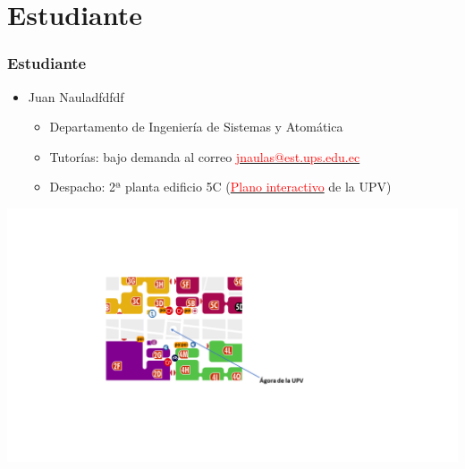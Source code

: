 \section{Estudiante}

\begin{frame}[fragile, label = profesorado]
\frametitle{Estudiante}
\begin{itemize}
    \item Juan Nauladfdfdf
    \begin{itemize}
        \item Departamento de Ingeniería de Sistemas y Atomática
        \item{Tutorías: bajo demanda al correo \href{mailto:jnaulas@est.ups.edu.ec}{\textcolor{red}{jnaulas@est.ups.edu.ec}}}
        \item Despacho: 2ª planta edificio 5C (\href{http://www.upv.es/plano/plano-2d-es.html?entidad=ACOM}{\textcolor{red}{Plano interactivo}} de la UPV)
    \end{itemize}
\end{itemize}


\includegraphics[trim=5cm 0cm 5cm 5cm, clip, width=1.2\textwidth]{PlanoUPV}

\end{frame}
